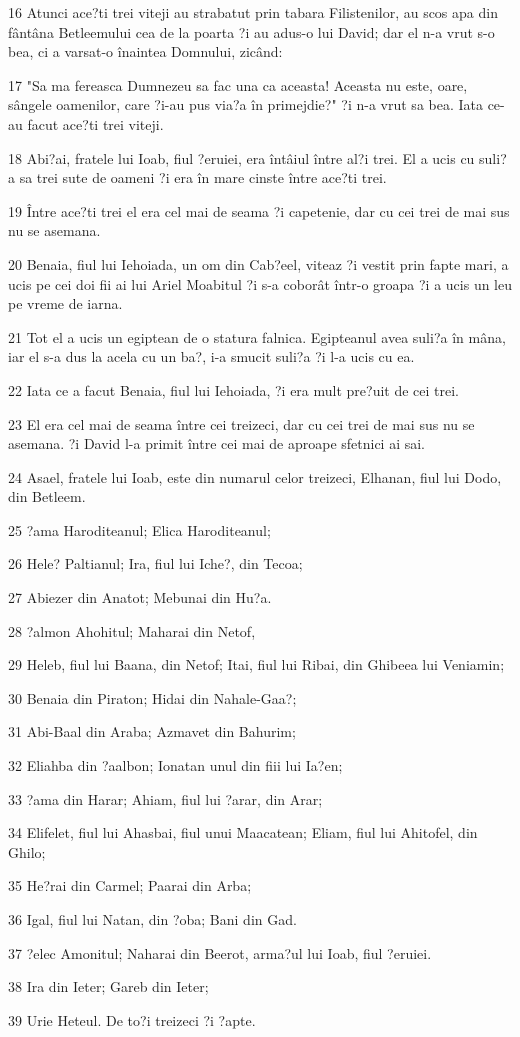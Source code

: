 \par 16 Atunci ace?ti trei viteji au strabatut prin tabara Filistenilor, au scos apa din fântâna Betleemului cea de la poarta ?i au adus-o lui David; dar el n-a vrut s-o bea, ci a varsat-o înaintea Domnului, zicând:
\par 17 "Sa ma fereasca Dumnezeu sa fac una ca aceasta! Aceasta nu este, oare, sângele oamenilor, care ?i-au pus via?a în primejdie?" ?i n-a vrut sa bea. Iata ce-au facut ace?ti trei viteji.
\par 18 Abi?ai, fratele lui Ioab, fiul ?eruiei, era întâiul între al?i trei. El a ucis cu suli?a sa trei sute de oameni ?i era în mare cinste între ace?ti trei.
\par 19 Între ace?ti trei el era cel mai de seama ?i capetenie, dar cu cei trei de mai sus nu se asemana.
\par 20 Benaia, fiul lui Iehoiada, un om din Cab?eel, viteaz ?i vestit prin fapte mari, a ucis pe cei doi fii ai lui Ariel Moabitul ?i s-a coborât într-o groapa ?i a ucis un leu pe vreme de iarna.
\par 21 Tot el a ucis un egiptean de o statura falnica. Egipteanul avea suli?a în mâna, iar el s-a dus la acela cu un ba?, i-a smucit suli?a ?i l-a ucis cu ea.
\par 22 Iata ce a facut Benaia, fiul lui Iehoiada, ?i era mult pre?uit de cei trei.
\par 23 El era cel mai de seama între cei treizeci, dar cu cei trei de mai sus nu se asemana. ?i David l-a primit între cei mai de aproape sfetnici ai sai.
\par 24 Asael, fratele lui Ioab, este din numarul celor treizeci, Elhanan, fiul lui Dodo, din Betleem.
\par 25 ?ama Haroditeanul; Elica Haroditeanul;
\par 26 Hele? Paltianul; Ira, fiul lui Iche?, din Tecoa;
\par 27 Abiezer din Anatot; Mebunai din Hu?a.
\par 28 ?almon Ahohitul; Maharai din Netof,
\par 29 Heleb, fiul lui Baana, din Netof; Itai, fiul lui Ribai, din Ghibeea lui Veniamin;
\par 30 Benaia din Piraton; Hidai din Nahale-Gaa?;
\par 31 Abi-Baal din Araba; Azmavet din Bahurim;
\par 32 Eliahba din ?aalbon; Ionatan unul din fiii lui Ia?en;
\par 33 ?ama din Harar; Ahiam, fiul lui ?arar, din Arar;
\par 34 Elifelet, fiul lui Ahasbai, fiul unui Maacatean; Eliam, fiul lui Ahitofel, din Ghilo;
\par 35 He?rai din Carmel; Paarai din Arba;
\par 36 Igal, fiul lui Natan, din ?oba; Bani din Gad.
\par 37 ?elec Amonitul; Naharai din Beerot, arma?ul lui Ioab, fiul ?eruiei.
\par 38 Ira din Ieter; Gareb din Ieter;
\par 39 Urie Heteul. De to?i treizeci ?i ?apte.

